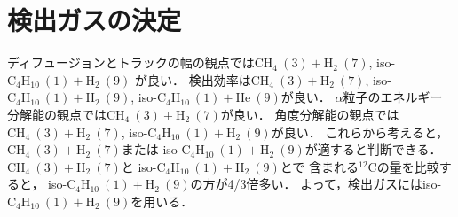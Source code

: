 \documentclass[../master]{subfiles}
\begin{document}
\section{検出ガスの決定}
ディフュージョンとトラックの幅の観点では$\mathrm{CH}_{4}\ (3) + \mathrm{H}_{2}\ (7)$,
iso-$\mathrm{C}_{4}\mathrm{H}_{10}\ (1) + \mathrm{H}_{2}\ (9)$ が良い．
検出効率は$\mathrm{CH}_{4}\ (3) + \mathrm{H}_{2}\ (7)$, iso-$\mathrm{C}_{4}\mathrm{H}_{10}\ (1) + \mathrm{H}_{2}\ (9)$,
iso-$\mathrm{C}_{4}\mathrm{H}_{10}\ (1) + \mathrm{He}\ (9)$が良い．
$\alpha$粒子のエネルギー分解能の観点では$\mathrm{CH}_{4}\ (3) + \mathrm{H}_{2}\ (7)$が良い．
角度分解能の観点では$\mathrm{CH}_{4}\ (3) + \mathrm{H}_{2}\ (7)$,
iso-$\mathrm{C}_{4}\mathrm{H}_{10}\ (1) + \mathrm{H}_{2}\ (9)$が良い．
これらから考えると，$\mathrm{CH}_{4}\ (3) + \mathrm{H}_{2}\ (7)$または
iso-$\mathrm{C}_{4}\mathrm{H}_{10}\ (1) + \mathrm{H}_{2}\ (9)$が適すると判断できる．
$\mathrm{CH}_{4}\ (3) + \mathrm{H}_{2}\ (7)$と iso-$\mathrm{C}_{4}\mathrm{H}_{10}\ (1) + \mathrm{H}_{2}\ (9)$とで
含まれる${}^{12}\mathrm{C}$の量を比較すると，
iso-$\mathrm{C}_{4}\mathrm{H}_{10}\ (1) + \mathrm{H}_{2}\ (9)$の方が4/3倍多い．
よって，検出ガスにはiso-$\mathrm{C}_{4}\mathrm{H}_{10}\ (1) + \mathrm{H}_{2}\ (9)$を用いる．
\end{document}
